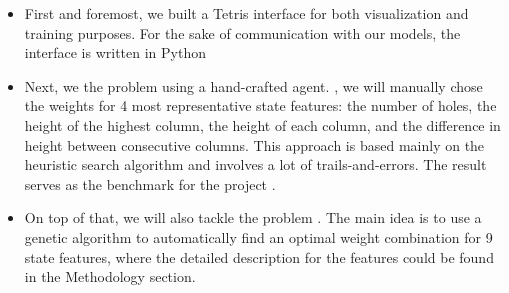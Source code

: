 \documentclass[letterpaper]{article} %
\begin{document}
\begin{itemize}
  \begin{itemize}
    \item 
    First and foremost, we built a Tetris interface for both visualization and training purposes. For the sake of communication with our models, the interface is written in Python 
    \item 
    Next, we  the problem using a hand-crafted agent.  \cite{Bertsekas_1996}, we will manually chose the weights for 4 most representative state features: the number of holes, the height of the highest column, the height of each column, and the difference in height between consecutive columns. This approach is based mainly on the heuristic search algorithm and involves a lot of trails-and-errors. The result serves as the benchmark for the project .
    \item 
    On top of that, we will also tackle the problem . The main idea is to use a genetic algorithm to automatically find an optimal weight combination for 9 state features, where the detailed description for the features could be found in the Methodology section. 
    

\end{itemize}
\end{itemize}
\end{document}
